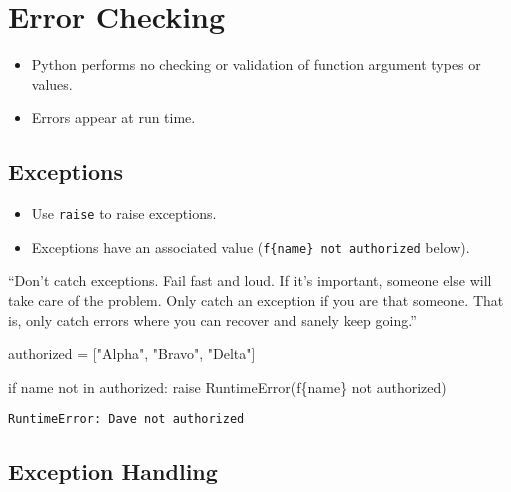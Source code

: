 \documentclass[
  letterpaper,
  DIV=11,
  numbers=noendperiod]{scrreprt}
\newenvironment{Shaded}{\begin{snugshade}}{\end{snugshade}}
\newcommand{\ControlFlowTok}[1]{\textcolor[rgb]{0.00,0.46,0.62}{#1}}
\newcommand{\KeywordTok}[1]{\textcolor[rgb]{0.00,0.46,0.62}{#1}}
\newcommand{\NormalTok}[1]{\textcolor[rgb]{0.00,0.46,0.62}{#1}}
\newcommand{\OperatorTok}[1]{\textcolor[rgb]{0.37,0.37,0.37}{#1}}
\newcommand{\PreprocessorTok}[1]{\textcolor[rgb]{0.68,0.00,0.00}{#1}}
\newcommand{\SpecialCharTok}[1]{\textcolor[rgb]{0.37,0.37,0.37}{#1}}
\newcommand{\SpecialStringTok}[1]{\textcolor[rgb]{0.13,0.47,0.30}{#1}}
\newcommand{\StringTok}[1]{\textcolor[rgb]{0.13,0.47,0.30}{#1}}
\providecommand{\tightlist}{%
  \setlength{\itemsep}{0pt}\setlength{\parskip}{0pt}}
\begin{document}
\hypertarget{error-checking}{%
\section{Error Checking}\label{error-checking}}

\begin{itemize}
\tightlist
\item
  Python performs no checking or validation of function argument types
  or values.
\item
  Errors appear at run time.
\end{itemize}

\hypertarget{exceptions}{%
\subsection{Exceptions}\label{exceptions}}

\begin{itemize}
\tightlist
\item
  Use \texttt{raise} to raise exceptions.
\item
  Exceptions have an associated value
  (\texttt{f\textquotesingle{}\{name\}\ not\ authorized\textquotesingle{}}
  below).
\end{itemize}

``Don't catch exceptions. Fail fast and loud. If it's important, someone
else will take care of the problem. Only catch an exception if you are
that someone. That is, only catch errors where you can recover and
sanely keep going.''

\begin{Shaded}
\begin{Highlighting}[]
\NormalTok{authorized }\OperatorTok{=}\NormalTok{ [}\StringTok{"Alpha"}\NormalTok{, }\StringTok{"Bravo"}\NormalTok{, }\StringTok{"Delta"}\NormalTok{]}

\ControlFlowTok{if}\NormalTok{ name }\KeywordTok{not} \KeywordTok{in}\NormalTok{ authorized:}
    \ControlFlowTok{raise} \PreprocessorTok{RuntimeError}\NormalTok{(}\SpecialStringTok{f\textquotesingle{}}\SpecialCharTok{\{}\NormalTok{name}\SpecialCharTok{\}}\SpecialStringTok{ not authorized\textquotesingle{}}\NormalTok{)}
\end{Highlighting}
\end{Shaded}

\begin{verbatim}
RuntimeError: Dave not authorized
\end{verbatim}

\hypertarget{exception-handling}{%
\subsection{Exception Handling}\label{exception-handling}}
\end{document}
